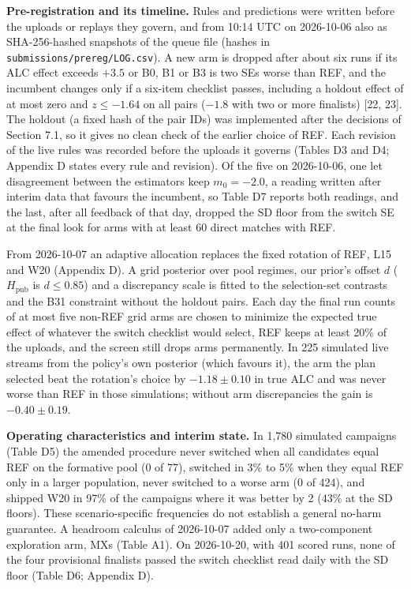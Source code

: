 \documentclass[
]{article}
\begin{document}
\textbf{Pre-registration and its timeline.} Rules and predictions were
written before the uploads or replays they govern, and from 10:14 UTC on
2026-10-06 also as SHA-256-hashed snapshots of the queue file (hashes in
\texttt{submissions/prereg/LOG.csv}). A new arm is dropped after about
six runs if its ALC effect exceeds \(+3.5\) or B0, B1 or B3 is two SEs
worse than REF, and the incumbent changes only if a six-item checklist
passes, including a holdout effect of at most zero and \(z \le -1.64\)
on all pairs (\(-1.8\) with two or more finalists) {[}22, 23{]}. The
holdout (a fixed hash of the pair IDs) was implemented after the
decisions of Section 7.1, so it gives no clean check of the earlier
choice of REF. Each revision of the live rules was recorded before the
uploads it governs (Tables D3 and D4; Appendix D states every rule and
revision). Of the five on 2026-10-06, one let disagreement between the
estimators keep \(m_0 = -2.0\), a reading written after interim data
that favours the incumbent, so Table D7 reports both readings, and the
last, after all feedback of that day, dropped the SD floor from the
switch SE at the final look for arms with at least 60 direct matches
with REF.

From 2026-10-07 an adaptive allocation replaces the fixed rotation of
REF, L15 and W20 (Appendix D). A grid posterior over pool regimes, our
prior's offset \(d\) (\(H_{\mathrm{pub}}\) is \(d \le 0.85\)) and a
discrepancy scale is fitted to the selection-set contrasts and the B31
constraint without the holdout pairs. Each day the final run counts of
at most five non-REF grid arms are chosen to minimize the expected true
effect of whatever the switch checklist would select, REF keeps at least
20\% of the uploads, and the screen still drops arms permanently. In 225
simulated live streams from the policy's own posterior (which favours
it), the arm the plan selected beat the rotation's choice by
\(-1.18 \pm 0.10\) in true ALC and was never worse than REF in those
simulations; without arm discrepancies the gain is \(-0.40 \pm 0.19\).

\textbf{Operating characteristics and interim state.} In 1,780 simulated
campaigns (Table D5) the amended procedure never switched when all
candidates equal REF on the formative pool (0 of 77), switched in 3\% to
5\% when they equal REF only in a larger population, never switched to a
worse arm (0 of 424), and shipped W20 in 97\% of the campaigns where it
was better by 2 (43\% at the SD floors). These scenario-specific
frequencies do not establish a general no-harm guarantee. A headroom
calculus of 2026-10-07 added only a two-component exploration arm, MXs
(Table A1). On 2026-10-20, with 401 scored runs, none of the four
provisional finalists passed the switch checklist read daily with the SD
floor (Table D6; Appendix D).
\end{document}
